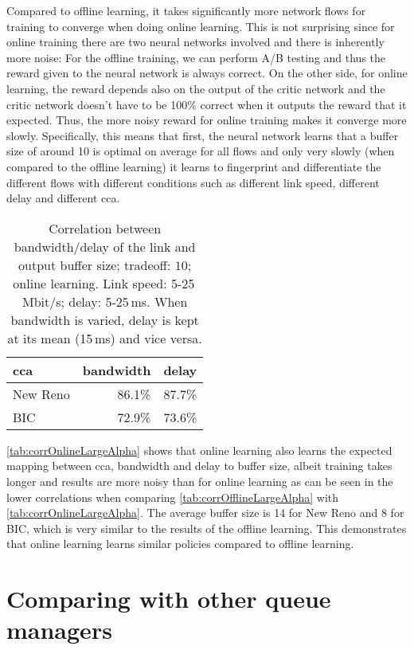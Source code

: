 \documentclass[conference]{IEEEtran}
\begin{document}
Compared to offline learning, it takes significantly more network flows for training to converge when doing online learning. This is not surprising since for online training there are two neural networks involved and there is inherently more noise: For the offline training, we can perform A/B testing and thus the reward given to the neural network is always correct. On the other side, for online learning, the reward depends also on the output of the critic network and the critic network doesn't have to be 100\% correct when it outputs the reward that it expected. Thus, the more noisy reward for online training makes it converge more slowly. Specifically, this means that first, the neural network learns that a buffer size of around 10 is optimal on average for all flows and only very slowly (when compared to the offline learning) it learns to fingerprint and differentiate the different flows with different conditions such as different link speed, different delay and different \gls{cca}. 

\begin{table}[h]
\caption{Correlation between bandwidth/delay of the link and output buffer size; tradeoff: $10$; online learning. Link speed: 5-25\,Mbit/s; delay: 5-25\,ms. When bandwidth is varied, delay is kept at its mean (15\,ms) and vice versa.} \label{tab:corrOnlineLargeAlpha}
\centering
\begin{tabular}{lrr} \toprule
\gls{cca} & bandwidth & delay \\ \midrule
New Reno & 86.1\% & 87.7\% \\
BIC & 72.9\% & 73.6\% \\
\bottomrule
\end{tabular}
\end{table}

\autoref{tab:corrOnlineLargeAlpha} shows that online learning also learns the expected mapping between \gls{cca}, bandwidth and delay to buffer size, albeit training takes longer and results are more noisy than for online learning as can be seen in the lower correlations when comparing \autoref{tab:corrOfflineLargeAlpha} with \autoref{tab:corrOnlineLargeAlpha}. The average buffer size is 14 for New Reno and 8 for BIC, which is very similar to the results of the offline learning. This demonstrates that online learning learns similar policies compared to offline learning. 

\section{Comparing with other queue managers}
\end{document}
